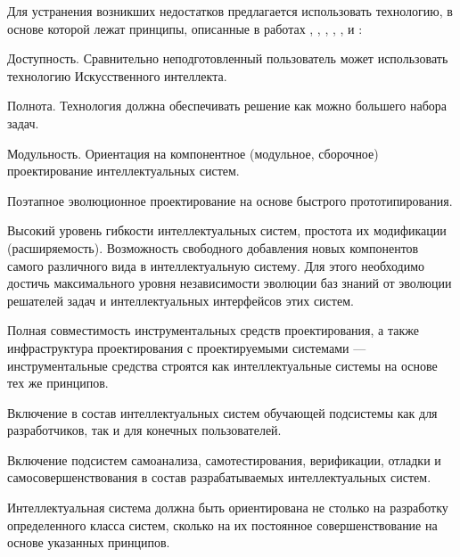 \begin{partbacktext}
Для устранения возникших недостатков предлагается использовать технологию, в основе которой лежат принципы, описанные в работах , , , , ,  и :
\begin{textitemize}
	\item Доступность. Сравнительно неподготовленный пользователь может использовать технологию Искусственного интеллекта.
	\item Полнота. Технология должна обеспечивать решение как можно большего набора задач.
	\item Модульность. Ориентация на компонентное (модульное, сборочное) проектирование интеллектуальных систем.
	\item Поэтапное эволюционное проектирование на основе быстрого прототипирования.
	\item Высокий уровень гибкости интеллектуальных систем, простота их модификации (расширяемость). Возможность свободного добавления новых компонентов самого различного вида в интеллектуальную систему. Для этого необходимо достичь максимального уровня независимости эволюции баз знаний от эволюции решателей задач и интеллектуальных интерфейсов этих систем.
	\item Полная совместимость инструментальных средств проектирования, а также инфраструктура проектирования с проектируемыми системами --- инструментальные средства строятся как интеллектуальные системы на основе тех же принципов.
	\item Включение в состав интеллектуальных систем обучающей подсистемы как для разработчиков, так и для конечных пользователей.
	\item Включение подсистем самоанализа, самотестирования, верификации, отладки и самосовершенствования в состав разрабатываемых интеллектуальных систем.
\end{textitemize}

Интеллектуальная система должна быть ориентирована не столько на разработку определенного класса систем, сколько на их постоянное совершенствование на основе указанных принципов.


\end{partbacktext}
